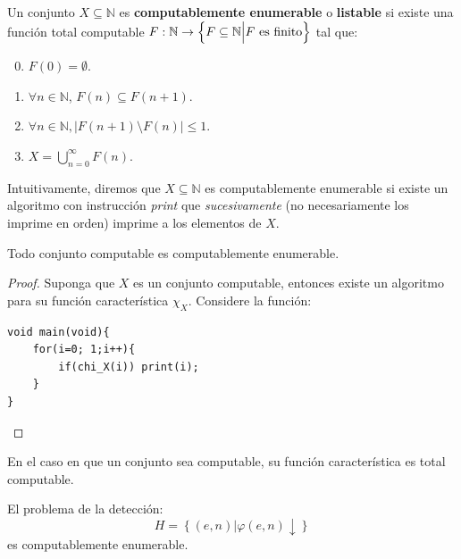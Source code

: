 \documentclass[12pt]{report}
\newcounter{it}
\theoremstyle{largebreak}
\newcommand\abs[1]{\ensuremath{\left|#1\right|}}
\newcommand\cf[3]{\ensuremath{#1:#2\rightarrow#3}}
\begin{document}
    \begin{mydef}
        Un conjunto $X\subseteq\mathbb{N}$ es \textbf{computablemente enumerable} o \textbf{listable} si existe una función total computable $\cf{F}{\mathbb{N}}{\left\{F\subseteq\mathbb{N}\Big|F\textup{ es finito} \right\}}$ tal que:
        \begin{enumerate}[label = \textit{(\arabic*)}]
            \setcounter{enumi}{-1}
            \item $F(0)=\emptyset$.
            \item $\forall n\in\mathbb{N}$, $F(n)\subseteq F(n+1)$.
            \item $\forall n\in\mathbb{N}, \abs{F(n+1)\setminus F(n)}\leq 1$.
            \item $X=\bigcup_{ n=0}^\infty F(n)$.
        \end{enumerate}
    \end{mydef}

    \begin{obs}
        Intuitivamente, diremos que $X\subseteq\mathbb{N}$ es computablemente enumerable si existe un algoritmo con instrucción \textit{print} que \textit{sucesivamente} (no necesariamente los imprime en orden) imprime a los elementos de $X$.
    \end{obs}

    \begin{exa}
        Todo conjunto computable es computablemente enumerable.
    \end{exa}

    \begin{proof}
        Suponga que $X$ es un conjunto computable, entonces existe un algoritmo para su función característica $\chi_X$. Considere la función:

        \begin{lstlisting}
void main(void){
    for(i=0; 1;i++){
        if(chi_X(i)) print(i);
    }
}
        \end{lstlisting}

    \end{proof}

    \begin{obs}
        En el caso en que un conjunto sea computable, su función característica es total computable.
    \end{obs}

    \begin{exa}
        El problema de la detección:
        \begin{equation*}
            H=\left\{(e,n)\Big|\varphi(e,n)\downarrow \right\}
        \end{equation*}
        es computablemente enumerable.
    \end{exa}
\end{document}
